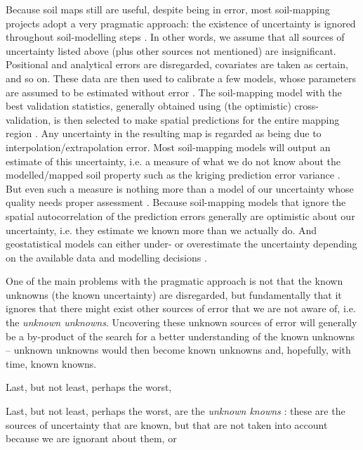 Because soil maps still are useful, despite being in error, most soil-mapping projects adopt a 
very pragmatic approach: the existence of uncertainty is ignored throughout soil-modelling steps 
\citep{McBratneyEtAl2003, ScullEtAl2003}. In other words, we assume that all sources of uncertainty 
listed above (plus other sources not mentioned) are insignificant. Positional and analytical errors 
are disregarded, covariates are taken as certain, and so on. These data are then used to calibrate 
a few models, whose parameters are assumed to be estimated without error \citep{DiggleEtAl1998}. 
The soil-mapping model with the best validation statistics, generally obtained using (the 
optimistic) cross-validation, is then selected to make spatial predictions for the entire mapping 
region \citep{BrusEtAl2011}. Any uncertainty in the resulting map is regarded as being due to 
interpolation/extrapolation error. Most soil-mapping models will output an estimate of this 
uncertainty, i.e. a measure of what we do not know about the modelled/mapped soil property such as 
the kriging prediction error variance \citep{HeuvelinkEtAl1989}. But even such a measure is nothing 
more than a model of our uncertainty whose quality needs proper assessment \citep{Goovaerts2001}. 
Because soil-mapping models that ignore the spatial autocorrelation of the prediction errors 
generally are optimistic about our uncertainty, i.e. they estimate we known more than we actually 
do. And geostatistical models can either under- or overestimate the uncertainty depending on the 
available data and modelling decisions \citep{Lark2000a}.


One of the main problems with the pragmatic approach is not that the known unknowns (the known 
uncertainty) are disregarded, but fundamentally that it ignores that there might exist other sources
of error that we are not aware of, i.e. the \textit{unknown unknowns}. Uncovering these unknown 
sources of error will generally be a by-product of the search for a better understanding of the 
known unknowns -- unknown unknowns would then become known unknowns and, hopefully, with time, 
known knowns.

Last, but not least, perhaps the worst,

Last, but not least, perhaps the worst, are the \textit{unknown knowns} \citep{Zizek2006}: 
these are the sources of uncertainty that are known, but that are not taken
into account because we are ignorant about them, or 







